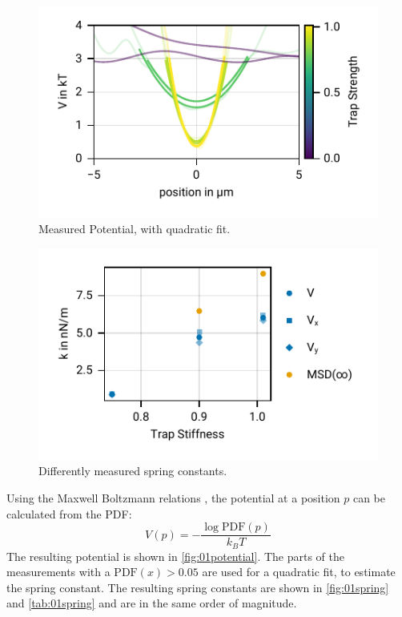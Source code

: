 \documentclass[
    twoside=false,
    twocolumn=true,
    fontsize=11pt,
]{scrarticle}
\begin{document}
\begin{figure}
    \centering
    \includegraphics{figures/01_03_3_axis.pdf}
    \caption{Measured Potential, with quadratic fit.}
    \label{fig:01potential}
\end{figure}
\begin{figure}
    \centering
    \includegraphics{figures/01_03_4_spring_constants.pdf}
    \caption{Differently measured spring constants.}
    \label{fig:01spring}
\end{figure}
Using the Maxwell Boltzmann relations \cite{instructions}, the potential at a position $p$ can be calculated from the PDF:
\begin{equation}
    V(p) = - \frac{\log{\text{PDF}(p)}}{k_B T}
    \label{eq:pot_boltzmann}
\end{equation}
The resulting potential is shown in \autoref{fig:01potential}.
The parts of the measurements with a $\text{PDF}(x)>0.05$ are used for a quadratic fit, to estimate the spring constant.
The resulting spring constants are shown in \autoref{fig:01spring} and \autoref{tab:01spring} and are in the same order of magnitude. 
\end{document}
